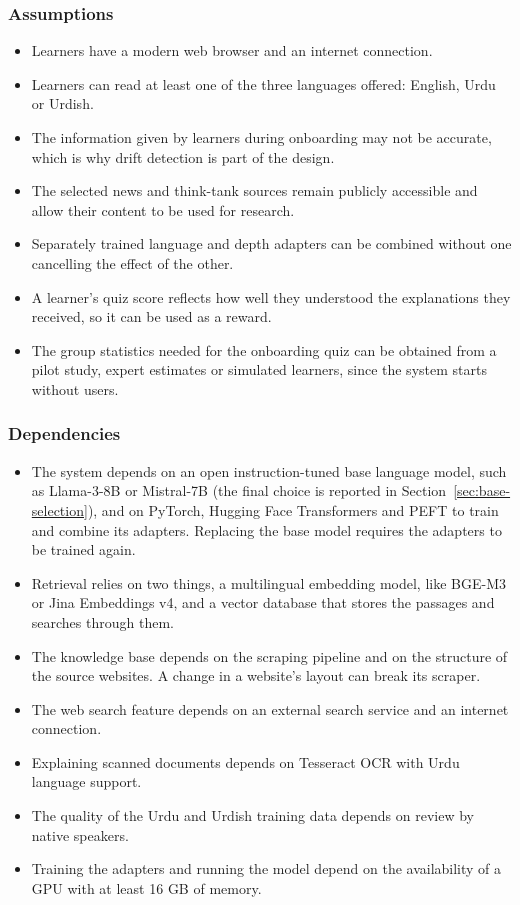 \documentclass{FastFyp}
\begin{document}
\subsubsection{Assumptions}
\begin{itemize}
    \item Learners have a modern web browser and an internet connection.
    \item Learners can read at least one of the three languages offered: English, Urdu or Urdish.
    \item The information given by learners during onboarding may not be accurate, which is why drift detection is part of the design.
    \item The selected news and think-tank sources remain publicly accessible and allow their content to be used for research.
    \item Separately trained language and depth adapters can be combined without one cancelling the effect of the other.
    \item A learner's quiz score reflects how well they understood the explanations they received, so it can be used as a reward.
    \item The group statistics needed for the onboarding quiz can be obtained from a pilot study, expert estimates or simulated learners, since the system starts without users.
\end{itemize}
 
\subsubsection{Dependencies}
\begin{itemize}
    \item The system depends on an open instruction-tuned base language model, such as Llama-3-8B or Mistral-7B (the final choice is reported in Section~\ref{sec:base-selection}), and on PyTorch, Hugging Face Transformers and PEFT to train and combine its adapters. Replacing the base model requires the adapters to be trained again.
    \item Retrieval relies on two things, a multilingual embedding model, like BGE-M3 or Jina Embeddings v4, and a vector database that stores the passages and searches through them.
    \item The knowledge base depends on the scraping pipeline and on the structure of the source websites. A change in a website's layout can break its scraper.
    \item The web search feature depends on an external search service and an internet connection.
    \item Explaining scanned documents depends on Tesseract OCR with Urdu language support.
    \item The quality of the Urdu and Urdish training data depends on review by native speakers.
    \item Training the adapters and running the model depend on the availability of a GPU with at least 16 GB of memory.
\end{itemize}
 
\end{document}
